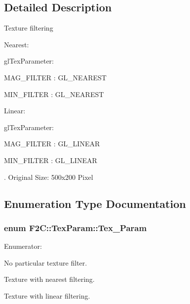 \subsection{Detailed Description}
Texture filtering \par
 Nearest: \par
 glTexParameter: \par
 MAG\_\-FILTER : GL\_\-NEAREST \par
 MIN\_\-FILTER : GL\_\-NEAREST \par
 \par
 Linear: \par
 glTexParameter: \par
 MAG\_\-FILTER : GL\_\-LINEAR \par
 MIN\_\-FILTER : GL\_\-LINEAR \par
 \par
.  Original Size: 500x200 Pixel \par
 

\subsection{Enumeration Type Documentation}
\hypertarget{namespace_f2_c_1_1_tex_param_a64299c3972944468af4e8b0394c936c6}{
\subsubsection[{Tex\_\-Param}]{\setlength{\rightskip}{0pt plus 5cm}enum {\bf F2C::TexParam::Tex\_\-Param}}}
\label{namespace_f2_c_1_1_tex_param_a64299c3972944468af4e8b0394c936c6}
\begin{Desc}
\item[Enumerator: ]\par
\begin{description}
\item[{\em 
\hypertarget{namespace_f2_c_1_1_tex_param_a64299c3972944468af4e8b0394c936c6aca6170cd53032a5477e3c636e400c6ff}{
None}
\label{namespace_f2_c_1_1_tex_param_a64299c3972944468af4e8b0394c936c6aca6170cd53032a5477e3c636e400c6ff}
}]No particular texture filter. \item[{\em 
\hypertarget{namespace_f2_c_1_1_tex_param_a64299c3972944468af4e8b0394c936c6a24ebbb7dc474946d5c959d8c4a34e3f1}{
Nearest}
\label{namespace_f2_c_1_1_tex_param_a64299c3972944468af4e8b0394c936c6a24ebbb7dc474946d5c959d8c4a34e3f1}
}]Texture with nearest filtering. \item[{\em 
\hypertarget{namespace_f2_c_1_1_tex_param_a64299c3972944468af4e8b0394c936c6ab324773649bec041f907ab81581a53bf}{
Linear}
\label{namespace_f2_c_1_1_tex_param_a64299c3972944468af4e8b0394c936c6ab324773649bec041f907ab81581a53bf}
}]Texture with linear filtering. \end{description}
\end{Desc}

